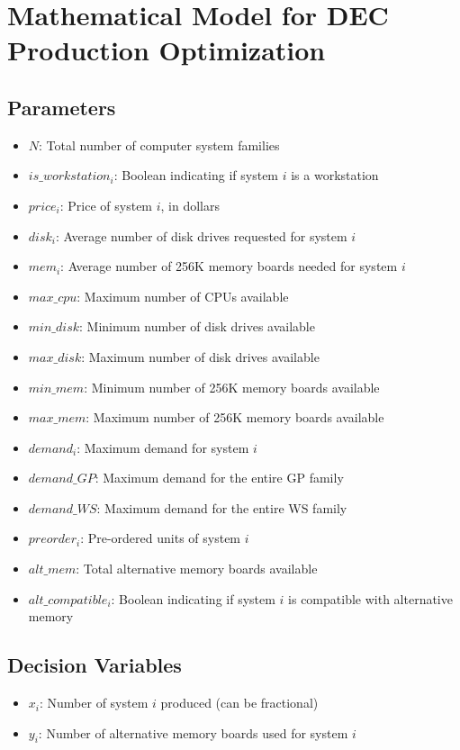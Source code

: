 \documentclass{article}
\begin{document}
\section*{Mathematical Model for DEC Production Optimization}

\subsection*{Parameters}
\begin{itemize}
    \item $N$: Total number of computer system families
    \item $is\_workstation_i$: Boolean indicating if system $i$ is a workstation
    \item $price_i$: Price of system $i$, in dollars
    \item $disk_i$: Average number of disk drives requested for system $i$
    \item $mem_i$: Average number of 256K memory boards needed for system $i$
    \item $max\_cpu$: Maximum number of CPUs available
    \item $min\_disk$: Minimum number of disk drives available
    \item $max\_disk$: Maximum number of disk drives available
    \item $min\_mem$: Minimum number of 256K memory boards available
    \item $max\_mem$: Maximum number of 256K memory boards available
    \item $demand_i$: Maximum demand for system $i$
    \item $demand\_GP$: Maximum demand for the entire GP family
    \item $demand\_WS$: Maximum demand for the entire WS family
    \item $preorder_i$: Pre-ordered units of system $i$
    \item $alt\_mem$: Total alternative memory boards available
    \item $alt\_compatible_i$: Boolean indicating if system $i$ is compatible with alternative memory
\end{itemize}

\subsection*{Decision Variables}
\begin{itemize}
    \item $x_i$: Number of system $i$ produced (can be fractional)
    \item $y_i$: Number of alternative memory boards used for system $i$
\end{itemize}
\end{document}
